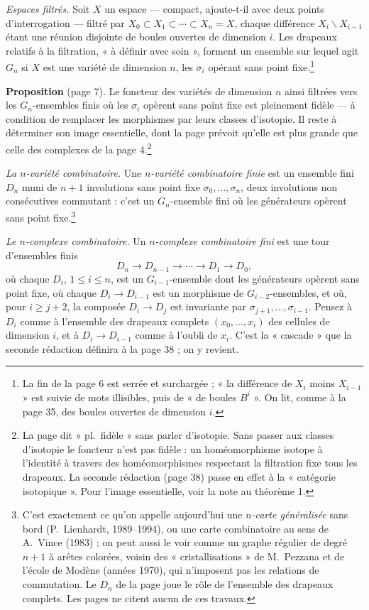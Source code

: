 \documentclass[11pt,a4paper]{article}
\begin{document}
\emph{Espaces filtrés.} Soit $X$ un espace --- compact, ajoute-t-il avec deux
points d'interrogation --- filtré par $X_0 \subset X_1 \subset \cdots \subset
X_n = X$, chaque différence $X_i \smallsetminus X_{i-1}$ étant une réunion
disjointe de boules ouvertes de dimension $i$. Les drapeaux relatifs à la
filtration, « à définir avec soin », forment un ensemble sur lequel agit
$G_n$ si $X$ est une variété de dimension $n$, les $\sigma_i$ opérant sans
point fixe.\footnote{La fin de la page 6 est serrée et surchargée ; « la
différence de $X_i$ moins $X_{i-1}$ » est suivie de mots illisibles, puis de
« de boules $B^i$ ». On lit, comme à la page 35, des boules ouvertes de
dimension $i$.}

\textbf{Proposition} (page 7). Le foncteur des variétés de dimension $n$
ainsi filtrées vers les $G_n$-ensembles finis où les $\sigma_i$ opèrent sans
point fixe est pleinement fidèle --- à condition de remplacer les morphismes
par leurs classes d'isotopie. Il reste à déterminer son image essentielle,
dont la page prévoit qu'elle est plus grande que celle des complexes de la
page 4.\footnote{La page dit « pl.\ fidèle » sans parler d'isotopie. Sans
passer aux classes d'isotopie le foncteur n'est pas fidèle : un homéomorphisme
isotope à l'identité à travers des homéomorphismes respectant la filtration
fixe tous les drapeaux. La seconde rédaction (page 38) passe en effet à la
« catégorie isotopique ». Pour l'image essentielle, voir la note au
théorème 1.}

\emph{La $n$-variété combinatoire.} Une \emph{$n$-variété combinatoire finie}
est un ensemble fini $D_n$ muni de $n+1$ involutions sans point fixe
$\sigma_0, \ldots, \sigma_n$, deux involutions non consécutives commutant :
c'est un $G_n$-ensemble fini où les générateurs opèrent sans point
fixe.\footnote{C'est exactement ce qu'on appelle aujourd'hui une
\emph{$n$-carte généralisée} sans bord (P.~Lienhardt, 1989--1994), ou une
carte combinatoire au sens de A.~Vince (1983) ; on peut aussi le voir comme un
graphe régulier de degré $n+1$ à arêtes colorées, voisin des
« cristallisations » de M.~Pezzana et de l'école de Modène (années 1970), qui
n'imposent pas les relations de commutation. Le $D_n$ de la page joue le rôle
de l'ensemble des drapeaux complets. Les pages ne citent aucun de ces
travaux.}

\emph{Le $n$-complexe combinatoire.} Un \emph{$n$-complexe combinatoire
fini} est une tour d'ensembles finis
\[
  D_n \longrightarrow D_{n-1} \longrightarrow \cdots \longrightarrow D_1
  \longrightarrow D_0 ,
\]
où chaque $D_i$, $1 \leqslant i \leqslant n$, est un $G_{i-1}$-ensemble dont
les générateurs opèrent sans point fixe, où chaque $D_i \to D_{i-1}$ est un
morphisme de $G_{i-2}$-ensembles, et où, pour $i \geqslant j + 2$, la
composée $D_i \to D_j$ est invariante par $\sigma_{j+1}, \ldots,
\sigma_{i-1}$. Pensez à $D_i$ comme à l'ensemble des drapeaux complets
$(x_0, \ldots, x_i)$ des cellules de dimension $i$, et à $D_i \to D_{i-1}$
comme à l'oubli de $x_i$. C'est la « cascade » que la seconde rédaction
définira à la page 38 ; on y revient.
\end{document}
